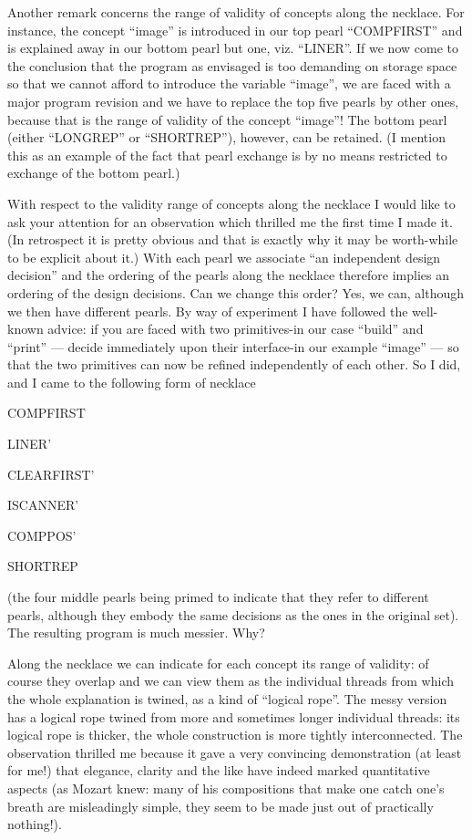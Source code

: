 Another remark concerns the range of validity of concepts along the necklace. For instance, the concept ``image'' is introduced in our top pearl ``COMPFIRST'' and is explained away in our bottom pearl but one, viz. ``LINER''. If we now come to the conclusion that the program as envisaged is too demanding on storage space so that we cannot afford to introduce the variable ``image'', we are faced with a major program revision and we have to replace the top five pearls by other ones, because that is the range of validity of the concept ``image''! The bottom pearl (either ``LONGREP'' or ``SHORTREP''), however, can be retained. (I mention this as an example of the fact that pearl exchange is by no means restricted to exchange of the bottom pearl.)

With respect to the validity range of concepts along the necklace I would like to ask your attention for an observation which thrilled me the first time I made it. (In retrospect it is pretty obvious and that is exactly why it may be worth-while to be explicit about it.) With each pearl we associate ``an independent design decision'' and the ordering of the pearls along the necklace therefore implies an ordering of the design decisions. Can we change this order? Yes, we can, although we then have different pearls. By way of experiment I have followed the well-known advice: if you are faced with two primitives-in our case ``build'' and ``print'' --- decide immediately upon their interface-in our example ``image'' --- so that the two primitives can now be refined independently of each other. So I did, and I came to the following form of necklace

COMPFIRST

LINER'

CLEARFIRST'

ISCANNER'

COMPPOS'

SHORTREP

\noindent
(the four middle pearls being primed to indicate that they refer to different pearls, although they embody the same decisions as the ones in the original set). The resulting program is much messier. Why?

Along the necklace we can indicate for each concept its range of validity: of course they overlap and we can view them as the individual threads from which the whole explanation is twined, as a kind of ``logical rope''. The messy version has a logical rope twined from more and sometimes longer individual threads: its logical rope is thicker, the whole construction is more tightly interconnected. The observation thrilled me because it gave a very convincing demonstration (at least for me!) that elegance, clarity and the like have indeed marked quantitative aspects (as Mozart knew: many of his compositions that make one catch one's breath are misleadingly simple, they seem to be made just out of practically nothing!).

